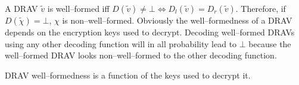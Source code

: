 \label{sec:well-formed-DRAV}

A DRAV $\widetilde{v}$ is well--formed iff $D(\widetilde{v}) \neq \bot
\Leftrightarrow D_l(\widetilde{v}) = D_r(\widetilde{v})$. Therefore, if
$D(\widetilde{\chi}) = \bot$, $\chi$ is non--well--formed. Obviously the
well--formedness of a DRAV depends on the encryption keys used to decrypt.
Decoding well--formed DRAVs using any other decoding function will in all
probability lead to $\bot$ because the well--formed DRAV looks non--well--formed
to the other decoding function.

\begin{lem}
  \label{lem:well-formed-fun-of-dec-fun}

  DRAV well--formedness is a function of the keys used to decrypt it.

\end{lem}
